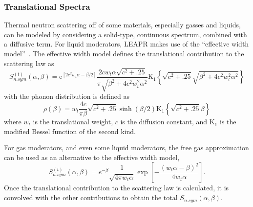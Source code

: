 \documentclass[../master.tex]{subfiles}
\begin{document}
			\subsubsection{Translational Spectra}
                           Thermal neutron scattering off of some materials, especially gasses and liquids, can be modeled by considering a solid-type, continuous spectrum, combined with a diffusive term. For liquid moderators, LEAPR makes use of the ``effective width model''~\cite{egelstaff}. The effective width model defines the translational contribution to the scattering law as  
                            \begin{equation}
                              S^{(t)}_{n.sym}(\alpha,\beta)=\mathrm{e}^{\left[2c^{2}w_{t}\alpha-\beta/2\right]}\frac{2cw_{t}\alpha\sqrt{c^{2}+.25}}{\pi\sqrt{\beta^{2}+4c^{2}w_{t}^{2}\alpha^{2}}}\mathrm{K}_{1}\left\{\sqrt{c^{2}+.25}\sqrt{\beta^{2}+4c^{2}w_{t}^{2}\alpha^{2}}\right\}
                            \end{equation}
                            with the phonon distribution is defined as
                            \begin{equation}
                              \rho(\beta)=w_{t}\frac{4c}{\pi\beta}\sqrt{c^{2}+.25}\sinh(\beta/2)\mathrm{K}_{1}\left\{\sqrt{c^{2}+.25}\beta\right\}
                            \end{equation}
                            where $w_t$ is the translational weight, $c$ is the diffusion constant, and $\mathrm{K}_1$ is the modified Bessel function of the second kind.\par
                            For gas moderators, and even some liquid moderators, the free gas approximation can be used as an alternative to the effective width model,
                            \begin{equation}
                              S^{(t)}_{n.sym}(\alpha,\beta)=e^{-\beta}\frac{1}{\sqrt{4\pi w_{t}\alpha}}\exp\left[-\frac{\left(w_{t}\alpha-\beta\right)^{2}}{4w_{t}\alpha}\right].
                            \end{equation}
                            Once the translational contribution to the scattering law is calculated, it is convolved with the other contributions to obtain the total $S_{n.sym}(\alpha,\beta)$.
\end{document}
